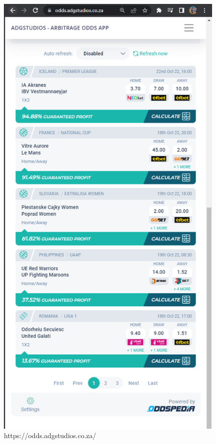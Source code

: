 \begin{figure}[h]
    \centering
    \includegraphics[scale=0.55]{images/arbitrageapp.png}
    \caption{https://odds.adgstudios.co.za/}
    \label{fig:odds}
\end{figure}

